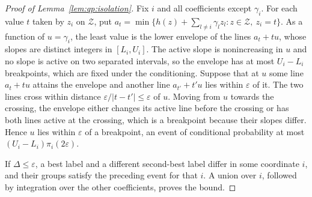 \begin{proof}[Proof of Lemma~\ref{lem:qp:isolation}]
Fix $i$ and all coefficients except $\gamma_i$. For each value $t$ taken by
$z_i$ on $\mathcal Z$, put
$a_t=\min\{h(z)+\sum_{l\ne i}\gamma_lz_l:z\in\mathcal Z,\ z_i=t\}$. As a
function of $u=\gamma_i$, the least value is the lower envelope of the lines
$a_t+tu$, whose slopes are distinct integers in $[L_i,U_i]$. The active slope
is nonincreasing in $u$ and no slope is active on two separated intervals, so
the envelope has at most $U_i-L_i$ breakpoints, which are fixed under the
conditioning. Suppose that at $u$ some line $a_t+tu$ attains the envelope and
another line $a_{t'}+t'u$ lies within $\varepsilon$ of it. The two lines
cross within distance $\varepsilon/|t-t'|\le\varepsilon$ of $u$. Moving from
$u$ towards the crossing, the envelope either changes its active line before
the crossing or has both lines active at the crossing, which is a breakpoint
because their slopes differ. Hence $u$ lies within $\varepsilon$ of a
breakpoint, an event of conditional probability at most
$(U_i-L_i)\pi_i(2\varepsilon)$.

If $\Delta\le\varepsilon$, a best label and a different second-best label
differ in some coordinate $i$, and their groups satisfy the preceding event
for that $i$. A union over $i$, followed by integration over the other
coefficients, proves the bound.
\end{proof}

